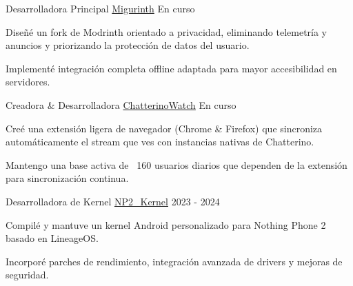\documentclass[11pt, a4paper]{awesome-cv}
\begin{document}
\begin{cventries}

  \cventry
    {Desarrolladora Principal} %
    {\href{https://migurinth.miguvt.com/}{Migurinth}} %
    {} %
    {En curso} %
    {
      \begin{cvitems} %
        \item {Diseñé un fork de Modrinth orientado a privacidad, eliminando telemetría y anuncios y priorizando la protección de datos del usuario.}
        \item {Implementé integración completa offline adaptada para mayor accesibilidad en servidores.}
      \end{cvitems}
    }

  \cventry
    {Creadora \& Desarrolladora} %
    {\href{https://github.com/MiguVT/ChatterinoWatch}{ChatterinoWatch}} %
    {} %
    {En curso} %
    {
      \begin{cvitems} %
        \item {Creé una extensión ligera de navegador (Chrome \& Firefox) que sincroniza automáticamente el stream que ves con instancias nativas de Chatterino.}
        \item {Mantengo una base activa de ~160 usuarios diarios que dependen de la extensión para sincronización continua.}
      \end{cvitems}
    }

  \cventry
    {Desarrolladora de Kernel} %
    {\href{https://github.com/MiguVT/NP2_Kernel}{NP2\_Kernel}} %
    {} %
    {2023 - 2024} %
    {
      \begin{cvitems} %
        \item {Compilé y mantuve un kernel Android personalizado para Nothing Phone 2 basado en LineageOS.}
        \item {Incorporé parches de rendimiento, integración avanzada de drivers y mejoras de seguridad.}
      \end{cvitems}
    }

\end{cventries}
\end{document}
